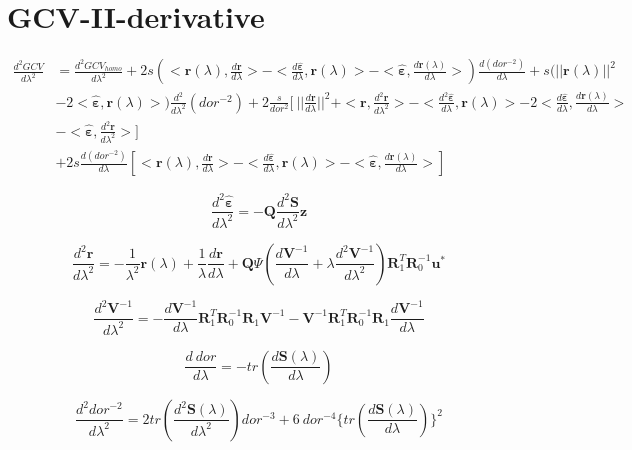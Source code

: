 \documentclass[11pt,twoside]{report}
\begin{document}
\section{GCV-II-derivative}
\begin{align*}
\frac{d^2 GCV}{d\lambda^2}&=\frac{d^2 GCV_{homo}}{d\lambda^2}+2s(<\textbf{r}(\lambda),\frac{d\textbf{r}}{d\lambda}>-<\frac{d\hat{\mathbold{\varepsilon}}}{d\lambda},\textbf{r}(\lambda)>-<\hat{\mathbold{\varepsilon}},\frac{d\textbf{r}(\lambda)}{d\lambda}>)\frac{d(dor^{-2})}{d\lambda}+s(||\textbf{r}(\lambda)||^2\\&-2<\hat{\mathbold{\varepsilon}},\textbf{r}(\lambda)>)\frac{d^2}{d\lambda^2}(dor^{-2})+2\frac{s}{dor^2}[\ ||\frac{d\textbf{r}}{d\lambda}||^2+<\textbf{r}, \frac{d^2\textbf{r}}{d\lambda^2}>-<\frac{d^2 \hat{\mathbold{\varepsilon}}}{d\lambda}, \textbf{r}(\lambda)>-2<\frac{d\hat{\mathbold{\varepsilon}}}{d\lambda}, \frac{d\textbf{r}(\lambda)}{d\lambda}>\\&-<\hat{\mathbold{\varepsilon}}, \frac{d^2\textbf{r}}{d\lambda^2}>]\\&+2s\frac{d(dor^{-2})}{d\lambda}[<\textbf{r}(\lambda),\frac{d\textbf{r}}{d\lambda}>-<\frac{d\hat{\mathbold{\varepsilon}}}{d\lambda},\textbf{r}(\lambda)>-<\hat{\mathbold{\varepsilon}},\frac{d\textbf{r}(\lambda)}{d\lambda}>]
\end{align*}

\begin{equation}
\frac{d^2\hat{\mathbold{\varepsilon}}}{d\lambda^2}=-\textbf{Q}\frac{d^2\textbf{S}}{d\lambda^2}\textbf{z}
\end{equation}

\begin{equation}
\frac{d^2\textbf{r}}{d\lambda^2}=-\frac{1}{\lambda^2}\textbf{r}(\lambda)+\frac{1}{\lambda}\frac{d\textbf{r}}{d\lambda}+\textbf{Q}\Psi (\frac{d\textbf{V}^{-1}}{d\lambda} +\lambda \frac{d^2\textbf{V}^{-1}}{d\lambda^2})\textbf{R}_1^T\textbf{R}_0^{-1}\textbf{u}^{*}
\end{equation}

\begin{equation}
\frac{d^2\textbf{V}^{-1}}{d\lambda^2}=-\frac{d\textbf{V}^{-1}}{d\lambda}\textbf{R}_1^T\textbf{R}_0^{-1}\textbf{R}_1 \textbf{V}^{-1}-\textbf{V}^{-1}\textbf{R}_1^T\textbf{R}_0^{-1}\textbf{R}_1\frac{d\textbf{V}^{-1}}{d\lambda}
\end{equation}

\begin{equation}
\frac{d\ dor}{d\lambda}=-tr(\frac{d\textbf{S}(\lambda)}{d\lambda})
\end{equation}


\begin{equation}
\frac{d^2 dor^{-2}}{d\lambda^2}=2tr(\frac{d^2\textbf{S}(\lambda)}{d\lambda^2})dor^{-3}+6\ dor^{-4}\{tr(\frac{d\textbf{S}(\lambda)}{d\lambda})\}^2
\end{equation}
\end{document}
